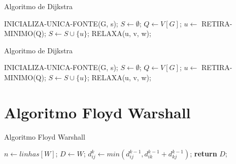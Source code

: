 \documentclass[aspectratio=169]{beamer}
\begin{document}
	\begin{frame}{Algoritmo de Dijkstra}
		\begin{algorithm}[H]
			\caption{Dijkstra}\label{alg:d}
			\begin{algorithmic}[1]
				\State INICIALIZA-UNICA-FONTE(G, s);               
				\State $S\gets \emptyset$;
				\State $Q\gets V[G]$;
				                       
				\State $u\gets$ RETIRA-MINIMO(Q);               
				\State $S\gets S \cup \{u\}$;
				               
				\State RELAXA(u, v, w);
				\EndFor
				\EndWhile\label{euclidendwhile}
				\EndProcedure
			\end{algorithmic}
		\end{algorithm}
	\end{frame}
	
	\begin{frame}{Algoritmo de Dijkstra}
		\begin{algorithm}[H]
			\caption{Dijkstra}\label{alg:d}
			\begin{algorithmic}[1]
				\State INICIALIZA-UNICA-FONTE(G, s);               
				\State $S\gets \emptyset$;
				\State $Q\gets V[G]$;
				                       
				\State $u\gets$ RETIRA-MINIMO(Q);               
				\State $S\gets S \cup \{u\}$;
				               
				\State RELAXA(u, v, w);                                   
				\EndFor
				\EndWhile\label{euclidendwhile}
				\EndProcedure
			\end{algorithmic}
		\end{algorithm}
	\end{frame}
	
	
\section{Algoritmo Floyd Warshall}
	\begin{frame}{Algoritmo Floyd Warshall}
		\begin{algorithm}[H]
			\caption{Floyd-Warshall}\label{alg:fw}
			\begin{algorithmic}[1]
				\State $n \gets linhas[W]$;
				\State $D\gets W$;
				\State $d^k_{ij} \gets min(d^{k-1}_{ij}, d^{k-1}_{ik} + d^{k-1}_{kj})$;
				\EndFor
				\EndFor
				\EndFor
				\State \textbf{return} $D$;
				\EndProcedure
			\end{algorithmic}
		\end{algorithm}
	\end{frame}
	
\end{document}
